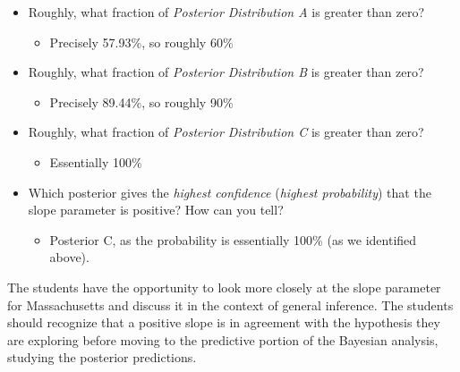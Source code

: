 \documentclass[
  12pt,
  letterpaper,
  DIV=11,
  numbers=noendperiod]{scrartcl}
\providecommand{\tightlist}{%
  \setlength{\itemsep}{0pt}\setlength{\parskip}{0pt}}\usepackage{longtable,booktabs,array}
\begin{document}
\begin{tcolorbox}[enhanced jigsaw, arc=.35mm, coltitle=black, leftrule=.75mm, bottomtitle=1mm, colback=white, rightrule=.15mm, colframe=quarto-callout-note-color-frame, toprule=.15mm, left=2mm, opacitybacktitle=0.6, toptitle=1mm, title={Questions for the Class}, colbacktitle=quarto-callout-note-color!10!white, breakable, titlerule=0mm, opacityback=0, bottomrule=.15mm]

\begin{itemize}
\tightlist
\item
  Roughly, what fraction of \emph{Posterior Distribution A} is greater
  than zero?

  \begin{itemize}
  \tightlist
  \item
    Precisely 57.93\%, so roughly 60\%
  \end{itemize}
\item
  Roughly, what fraction of \emph{Posterior Distribution B} is greater
  than zero?

  \begin{itemize}
  \tightlist
  \item
    Precisely 89.44\%, so roughly 90\%
  \end{itemize}
\item
  Roughly, what fraction of \emph{Posterior Distribution C} is greater
  than zero?

  \begin{itemize}
  \tightlist
  \item
    Essentially 100\%
  \end{itemize}
\item
  Which posterior gives the \emph{highest confidence} (\emph{highest
  probability}) that the slope parameter is positive? How can you tell?

  \begin{itemize}
  \tightlist
  \item
    Posterior C, as the probability is essentially 100\% (as we
    identified above).
  \end{itemize}
\end{itemize}

\end{tcolorbox}

The students have the opportunity to look more closely at the slope
parameter for Massachusetts and discuss it in the context of general
inference. The students should recognize that a positive slope is in
agreement with the hypothesis they are exploring before moving to the
predictive portion of the Bayesian analysis, studying the posterior
predictions.
\end{document}
